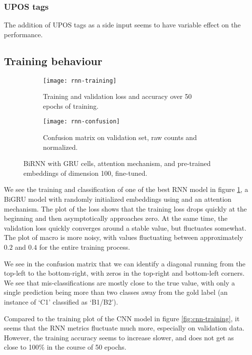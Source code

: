 \subsubsection*{UPOS tags}

The addition of UPOS tags as a side input seems to have variable effect on
the performance. 


\subsection{Training behaviour}

\begin{figure}
  \begin{subfigure}{\linewidth}
    \centering
    \texttt{[image: rnn-training]}
    \caption{Training and validation loss and accuracy over 50 epochs of training.}
  \end{subfigure}
  \begin{subfigure}{\linewidth}
    \centering
    \texttt{[image: rnn-confusion]}
    \caption{Confusion matrix on validation set, raw counts and normalized.}
  \end{subfigure}
  \caption[Training behaviour of BiGRU with attention]{
    BiRNN with GRU cells, attention mechanism, and pre-trained
    embeddings of dimension 100, fine-tuned.
  }
  \label{fig:rnn-training}
\end{figure}

We see the training and classification of one of the best RNN model in figure
\ref{fig:rnn-training}, a BiGRU model with randomly initialized embeddings
using and an attention mechanism. The plot of the loss shows that the
training loss drops quickly at the beginning and then asymptotically
approaches zero. At the same time, the validation loss quickly converges
around a stable value, but fluctuates somewhat. The plot of macro \FI is more
noisy, with values fluctuating between approximately $0.2$ and $0.4$ for the
entire training process.

We see in the confusion matrix that we can identify a diagonal running from
the top-left to the bottom-right, with zeros in the top-right and bottom-left
corners. We see that mis-classifications are mostly close to the true value,
with only a single prediction being more than two classes away from the gold
label (an instance of `C1' classified as `B1/B2').

Compared to the training plot of the CNN model in figure
\ref{fig:cnn-training}, it seems that the RNN metrics fluctuate much more,
especially on validation data. However, the training accuracy seems to
increase slower, and does not get as close to 100\% in the course of 50 epochs.


